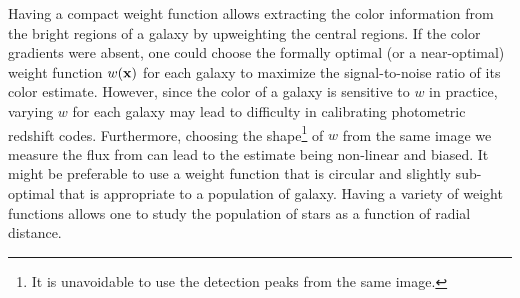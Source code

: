 Having a compact weight function allows extracting the color information from the bright regions of a galaxy by upweighting the central regions.
If the color gradients were absent, one could choose the formally optimal (or a near-optimal) weight function $w({\bf x})$ for each galaxy to maximize the signal-to-noise ratio of its color estimate.
However, since the color of a galaxy is sensitive to $w$ in practice, varying $w$ for each galaxy may lead to difficulty in calibrating photometric redshift codes.
Furthermore, choosing the shape\footnote{It is unavoidable to use the detection peaks from the same image.} of $w$ from the same image we measure the flux from can lead to the estimate being non-linear and biased.
It might be preferable to use a weight function that is circular and slightly sub-optimal that is appropriate to a population of galaxy.
Having a variety of weight functions allows one to study the population of stars as a function of radial distance.

\begin{comment}
\subsection{Noise bias}
Ideally, we want linear estimator.
This is impossible if the weight function is centered based on the measured centroid from the same image.
Adaptive the shape of the weight function to match the observed shape of the source worsens it.
However, if even the flux estimator is linear, the estimator for color as the ratio of flux estimators is biased, as it is not linear.
Morever, the bias depends on the color in the non-trivial way.
It would be beneficial to use adaptive weight function to perform optimal photometry instead of circular apertures with pre-defined widths.
We provide both the
\end{comment}